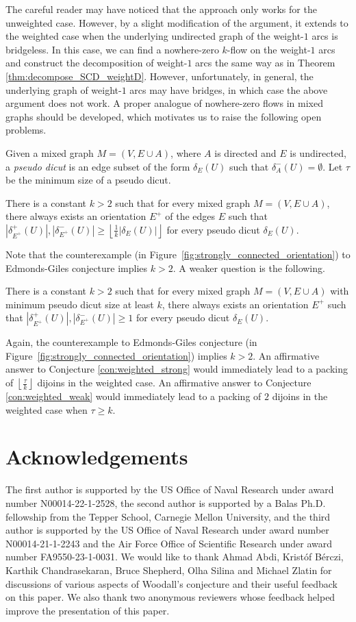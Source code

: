 \documentclass[runningheads]{llncs}
\newcommand{\rounddown}[1]{\left\lfloor#1\right\rfloor}
\begin{document}
The careful reader may have noticed that the approach only works for the unweighted case. However, by a slight modification of the argument, it extends to the weighted case when the underlying undirected graph of the weight-$1$ arcs is bridgeless. In this case, we can find a nowhere-zero $k$-flow on the weight-$1$ arcs and construct the decomposition of weight-$1$ arcs the same way as in Theorem \ref{thm:decompose_SCD_weightD}. However, unfortunately, in general, the underlying graph of weight-$1$ arcs may have bridges, in which case the above argument does not work. 
A proper analogue of nowhere-zero flows in mixed graphs should be developed, which motivates us to raise the following open problems.
    
Given a mixed graph $M=(V,E\cup A)$, where $A$ is directed and $E$ is undirected, a \textit{pseudo dicut} is an edge subset of the form $\delta_E(U)$ such that $\delta^-_A(U)=\emptyset$. Let $\tau$ be the minimum size of a pseudo dicut.
\begin{conjecture}\label{con:weighted_strong}
There is a constant $k>2$ such that for every mixed graph $M=(V,E\cup A)$, there always exists an orientation $E^+$ of the edges $E$ such that 
$|\delta_{E^+}^+(U)|,|\delta_{E^+}^-(U)|\geq \rounddown{\frac{1}{k}|\delta_E(U)|}$ for every pseudo dicut $\delta_E(U)$.
\end{conjecture}
Note that the counterexample (in Figure~\ref{fig:strongly_connected_orientation}) to Edmonds-Giles conjecture implies $k> 2$. A weaker question is the following.
\begin{conjecture}\label{con:weighted_weak}
    There is a constant $k>2$ such that for every mixed graph $M=(V,E\cup A)$ with minimum pseudo dicut size at least $k$, there always exists an orientation $E^+$ such that $|\delta_{E^+}^+(U)|,|\delta_{E^+}^-(U)|\geq 1$ for every pseudo dicut $\delta_E(U)$.
\end{conjecture}
Again, the counterexample to Edmonds-Giles conjecture (in Figure~\ref{fig:strongly_connected_orientation}) implies $k>2$. An affirmative answer to Conjecture \ref{con:weighted_strong} would immediately lead to a packing of $\rounddown{\frac{\tau}{k}}$ dijoins in the weighted case. An affirmative answer to Conjecture \ref{con:weighted_weak} would immediately lead to a packing of $2$ dijoins in the weighted case when $\tau\geq k$.


\section*{Acknowledgements}
The first author is supported by the US Office of Naval Research under award number N00014-22-1-2528, the second author is supported by a Balas Ph.D. fellowship from the Tepper School, Carnegie Mellon University, and the third author is supported by the US Office of Naval Research under award number N00014-21-1-2243 and the Air Force Office of Scientific Research under award number FA9550-23-1-0031. We would like to thank Ahmad Abdi, Krist\'of B\'erczi, Karthik Chandrasekaran, Bruce Shepherd, Olha Silina and Michael Zlatin for discussions of various aspects of Woodall's conjecture and their useful feedback on this paper. We also thank two anonymous reviewers whose feedback helped improve the presentation of this paper.

\newpage
 
\end{document}
